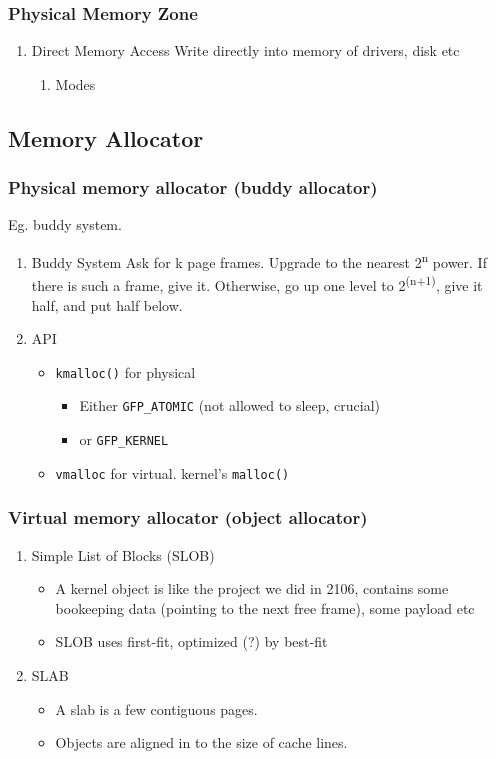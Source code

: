 \documentclass[11pt]{article}
\begin{document}
\subsubsection{Physical Memory Zone}
\label{sec:orgd543790}
\begin{enumerate}
\item Direct Memory Access
\label{sec:org4d3d9cc}
Write directly into memory of drivers, disk etc
\begin{enumerate}
\item Modes
\label{sec:orgcb70114}
\end{enumerate}
\end{enumerate}
\subsection{Memory Allocator}
\label{sec:org3915196}
\subsubsection{Physical memory allocator (buddy allocator)}
\label{sec:orgee7ef84}
Eg. buddy system.
\begin{enumerate}
\item Buddy System
\label{sec:org62bcaf6}
Ask for k page frames. Upgrade to the nearest 2\textsuperscript{n} power. If there is such a
frame, give it. Otherwise, go up one level to 2\textsuperscript{(n+1)}, give it half, and put
half below.
\item API
\label{sec:orgde3c005}
\begin{itemize}
\item \texttt{kmalloc()} for physical
\begin{itemize}
\item Either \texttt{GFP\_ATOMIC} (not allowed to sleep, crucial)
\item or \texttt{GFP\_KERNEL}
\end{itemize}
\item \texttt{vmalloc} for virtual. kernel's \texttt{malloc()}
\end{itemize}
\end{enumerate}
\subsubsection{Virtual memory allocator (object allocator)}
\label{sec:org0bc6cf8}
\begin{enumerate}
\item Simple List of Blocks (SLOB)
\label{sec:org600c3ff}
\begin{itemize}
\item A kernel object is like the project we did in 2106, contains some bookeeping
data (pointing to the next free frame), some payload etc
\item SLOB uses first-fit, optimized (?) by best-fit
\end{itemize}
\item SLAB
\label{sec:org70f733c}
\begin{itemize}
\item A slab is a few contiguous pages.
\item Objects are aligned in to the size of cache lines.
\end{itemize}
\end{enumerate}
\end{document}
